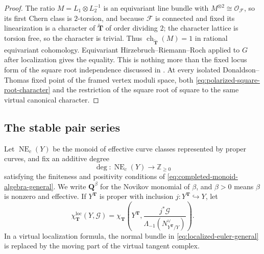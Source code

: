 \documentclass{amsart}
\theoremstyle{definition}
\numberwithin{equation}{section}
\newcommand{\Z}{\mathbb Z}
\newcommand{\cO}{\mathcal O}
\newcommand{\ch}{\operatorname{ch}}
\begin{document}
\begin{proof}
The ratio \(M=L_1\otimes L_2^{-1}\) is an equivariant line bundle with \(M^{\otimes2}\cong\cO_{\mathscr F}\), so its first Chern class is \(2\)-torsion, and because \(\mathscr F\) is connected and fixed its linearization is a character of \(\widetilde{\mathbf T}\) of order dividing \(2\); the character lattice is torsion free, so the character is trivial.  Thus \(\ch_{\widetilde{\mathbf T}}(M)=1\) in rational equivariant cohomology.  Equivariant Hirzebruch--Riemann--Roch applied to \(G\) after localization gives the equality.  This is nothing more than the fixed locus form of the square root independence discussed in \cite[Section~2.6]{Arbesfeld}.  At every isolated Donaldson--Thomas fixed point of the framed vertex moduli space, both \eqref{eq:polarized-square-root-character} and the restriction of the square root of \cite[Lemma~3.3.7]{KuhnLiuThimm} square to the same virtual canonical character.
\end{proof}

\subsection{The stable pair series}
Let \(\operatorname{NE}_c(Y)\) be the monoid of effective curve classes represented by proper curves, and fix an additive degree
\[
 \deg:\operatorname{NE}_c(Y)\to\Z_{\geq0}
\]
satisfying the finiteness and positivity conditions of \eqref{eq:completed-monoid-algebra-general}.  We write \(\mathbf Q^\beta\) for the Novikov monomial of \(\beta\), and \(\beta>0\) means \(\beta\) is nonzero and effective.  If \(Y^{\mathbf T}\) is proper with inclusion \(j:Y^{\mathbf T}\hookrightarrow Y\), let
\begin{equation}
 \chi_{\mathbf T}^{\mathrm{loc}}(Y,\mathcal G)
 =\chi_{\mathbf T}\left(Y^{\mathbf T},
  \frac{j^*\mathcal G}{\Lambda_{-1}(N_{Y^{\mathbf T}/Y}^{\vee})}\right).
\label{eq:localized-euler-general}
\end{equation}
In a virtual localization formula, the normal bundle in \eqref{eq:localized-euler-general} is replaced by the moving part of the virtual tangent complex.
\end{document}
